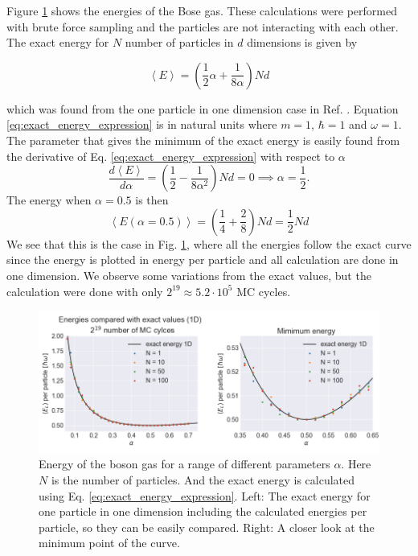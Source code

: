 Figure \ref{fig:exact_comparison_1D} shows the energies of the Bose gas. These calculations were performed with brute force sampling and the particles are not interacting with each other. The exact energy for $N$ number of particles in $d$ dimensions is given by

\begin{equation}\label{eq:exact_energy_expression}
\left< E \right> =\left( \frac{1}{2}\alpha + \frac{1}{8 \alpha}\right)Nd
\end{equation}

which was found from the one particle in one dimension case in Ref. \cite{GriffithsDavidJ1995Itqm}. Equation \ref{eq:exact_energy_expression} is in natural units where $m = 1$, $\hbar = 1$ and $\omega = 1$. The parameter that gives the minimum of the exact energy is easily found from the derivative of Eq. \ref{eq:exact_energy_expression} with respect to $\alpha$
$$ \frac{d \left<E\right>}{d \alpha}  = \left(\frac{1}{2} - \frac{1}{8\alpha^2}\right)Nd = 0 \implies \alpha = \frac{1}{2}. $$
The energy when $\alpha = 0.5$ is then
$$ \left< E(\alpha = 0.5)\right> = \left(\frac{1}{4} + \frac{2}{8}\right)Nd = \frac{1}{2}Nd $$
We see that this is the case in Fig. \ref{fig:exact_comparison_1D}, where all the energies follow the exact curve since the energy is plotted in energy per particle and all calculation are done in one dimension. We observe some variations from the exact values, but the calculation were done with only $2^{19} \approx 5.2\cdot10^{5}$ MC cycles. 

\begin{figure}[H]
\center
\includegraphics[width=\linewidth]{../Results/comparing_with_exact_1D}\caption{Energy of the boson gas for a range of different parameters $\alpha$. Here $N$ is the number of particles. And the exact energy is calculated using Eq. \ref{eq:exact_energy_expression}. Left: The exact energy for one particle in one dimension including the calculated energies per particle, so they can be easily compared. Right: A closer look at the minimum point of the curve.}\label{fig:exact_comparison_1D}
\end{figure}

